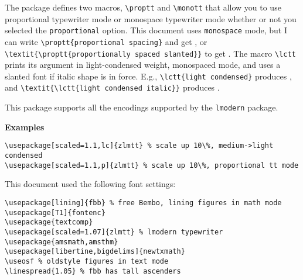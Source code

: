 \documentclass[11pt]{article}
\begin{document}
The package defines two macros, \verb|\proptt| and \verb|\monott| that allow you to use proportional typewriter mode or monospace typewriter mode whether or not you selected the {\tt proportional} option. This document uses {\tt monospace} mode, but I can write \verb|\proptt{proportional spacing}| and get , or \verb|\textit{\proptt{proportionally spaced slanted}}| to get \textit{}. The macro \verb|\lctt| prints its argument in light-condensed weight, monospaced mode, and uses a slanted font if italic shape is in force. E.g., \verb|\lctt{light condensed}| produces , and \verb|\textit{\lctt{light condensed italic}}| produces \textit{}.

This package supports all the encodings supported by the {\tt lmodern} package.

{\bf Examples}
\begin{verbatim}
\usepackage[scaled=1.1,lc]{zlmtt} % scale up 10\%, medium->light condensed
\usepackage[scaled=1.1,p]{zlmtt} % scale up 10\%, proportional tt mode
\end{verbatim}
This document used the following font settings:
\begin{verbatim}
\usepackage[lining]{fbb} % free Bembo, lining figures in math mode
\usepackage[T1]{fontenc}
\usepackage{textcomp}
\usepackage[scaled=1.07]{zlmtt} % lmodern typewriter
\usepackage{amsmath,amsthm}
\usepackage[libertine,bigdelims]{newtxmath}
\useosf % oldstyle figures in text mode
\linespread{1.05} % fbb has tall ascenders
\end{verbatim}
\end{document}
